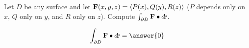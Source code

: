 \documentclass{ximera}
\author{David Guichard \and Neal Koblitz \and H. Jerome Keisler \and Albert Scheller \and Barry Balof \and Mike Wills \and Matthew Carr}
\begin{document}
\begin{exercise}




Let $D$ be any surface and let $\mathbf{F}(x,y,z)=\left\langle P(x),Q(y),R(z)\right\rangle$ ($P$ depends only on $x$, $Q$ only on $y$, and $R$ only on $z$). Compute $\int_{\partial D}\mathbf{F}\bullet\mathop{}\!d\!\mathbf{r}$.
\begin{prompt}
\[
\int_{\partial D}\vec{F}\dotp\d\vec{r}=\answer{0}
\]
\end{prompt}


\end{exercise}
\end{document}
